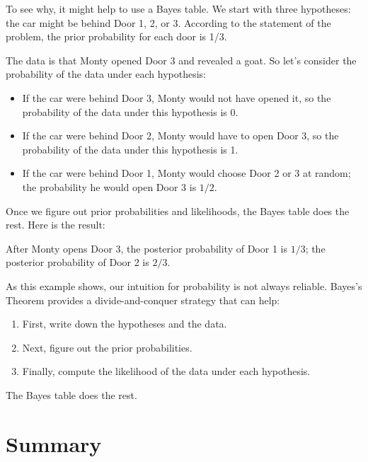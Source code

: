 \documentclass[12pt]{book}
\theoremstyle{exercise}
\begin{document}
To see why, it might help to use a Bayes table.
We start with three hypotheses: the car might be behind Door 1, 2, or 3.
According to the statement of the problem, the prior probability for each door is 1/3.

The data is that Monty opened Door 3 and revealed a goat.
So let's consider the probability of the data under each hypothesis:

\begin{itemize}

\item If the car were behind Door 3, Monty would not have opened it, so the probability of the data under this hypothesis is 0.

\item If the car were behind Door 2, Monty would have to open Door 3, so the probability of the data under this hypothesis is 1.

\item If the car were behind Door 1, Monty would choose Door 2 or 3 at random; the probability he would open Door 3 is $1/2$.

\end{itemize}

Once we figure out prior probabilities and likelihoods, the Bayes table does the rest.  Here is the result:



After Monty opens Door 3, the posterior probability of Door 1 is $1/3$; the posterior probability of Door 2 is $2/3$.


As this example shows, our intuition for probability is not always reliable.
Bayes's Theorem provides a divide-and-conquer strategy that can help:

\begin{enumerate}

\item First, write down the hypotheses and the data.

\item Next, figure out the prior probabilities.

\item Finally, compute the likelihood of the data under each hypothesis.

\end{enumerate}

The Bayes table does the rest.

\section{Summary}
\end{document}
